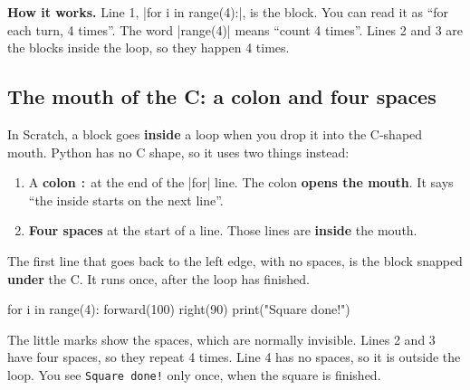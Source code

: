 \textbf{How it works.} Line 1, \py|for i in range(4):|, is the  block. You can read it as ``for each turn, 4 times''. The word \py|range(4)| means ``count 4 times''. Lines 2 and 3 are the blocks inside the loop, so they happen 4 times.

\subsection*{The mouth of the C: a colon and four spaces}

In Scratch, a block goes \textbf{inside} a loop when you drop it into the C-shaped mouth. Python has no C shape, so it uses two things instead:

\begin{enumerate}
  \item A \textbf{colon} \texttt{:} at the end of the \py|for| line. The colon \textbf{opens the mouth}. It says ``the inside starts on the next line''.
  \item \textbf{Four spaces} at the start of a line. Those lines are \textbf{inside} the mouth.
\end{enumerate}

The first line that goes back to the left edge, with no spaces, is the block snapped \textbf{under} the C. It runs once, after the loop has finished.

\begin{tcbraster}[raster columns=2, raster equal height=rows, raster column skip=12pt, raster valign=center]
\begin{tcolorbox}[colback=white, colframe=white, boxrule=0pt, valign=center]
\begin{scratch}[scale=0.85]
\end{scratch}
\end{tcolorbox}
\begin{spaces}
for i in range(4):
    forward(100)
    right(90)
print("Square done!")
\end{spaces}
\end{tcbraster}

The little \texttt{\textvisiblespace} marks show the spaces, which are normally invisible. Lines 2 and 3 have four spaces, so they repeat 4 times. Line 4 has no spaces, so it is outside the loop. You see \texttt{Square done!} only once, when the square is finished.

